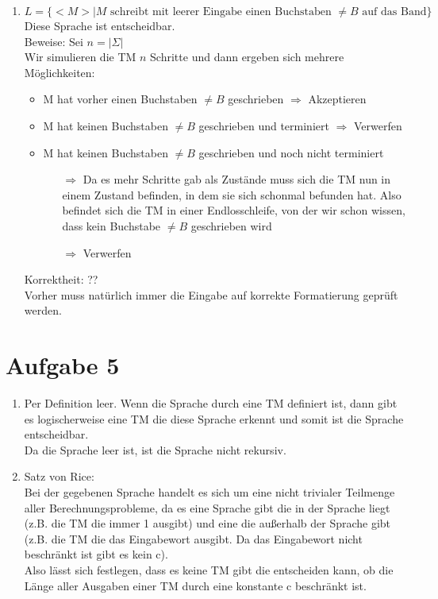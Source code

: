 \documentclass[a4paper,11pt]{scrartcl}
\begin{document}
\begin{enumerate}[label=\alph*)]
	\item	$L = \{<M> \vert M \text{ schreibt mit leerer Eingabe einen Buchstaben } \neq B \text{ auf das Band}\}$\\
			Diese Sprache ist entscheidbar.\\
			Beweise: Sei $n = \vert \Sigma \vert$\\
			Wir simulieren die TM $n$ Schritte und dann ergeben sich mehrere Möglichkeiten:
			\begin{itemize}
			\item M hat vorher einen Buchstaben $\neq B$ geschrieben $\Rightarrow$ Akzeptieren
			\item M hat keinen Buchstaben $\neq B$ geschrieben und terminiert $\Rightarrow$ Verwerfen
			\item M hat keinen Buchstaben $\neq B$ geschrieben und noch nicht terminiert
				\begin{itemize}
				\item[$\Rightarrow$] Da es mehr Schritte gab als Zustände muss sich die TM nun in einem Zustand befinden, in dem sie sich schonmal befunden hat. Also befindet sich die TM in einer Endlosschleife, von der wir schon wissen, dass kein Buchstabe $\neq B$ geschrieben wird
				\item[$\Rightarrow$] Verwerfen
				\end{itemize}
			\end{itemize}
			Korrektheit: ??\\
			Vorher muss natürlich immer die Eingabe auf korrekte Formatierung geprüft werden.
	\end{enumerate}
	
	
	\section*{Aufgabe 5}
	\begin{enumerate}[label=\alph*)]
	\item 	Per Definition leer. Wenn die Sprache durch eine TM definiert ist, dann gibt es logischerweise eine TM die diese Sprache erkennt und somit ist die Sprache entscheidbar.\\
   			Da die Sprache leer ist, ist die Sprache nicht rekursiv.
   	\item 	Satz von Rice: \\
   			Bei der gegebenen Sprache handelt es sich um eine nicht trivialer Teilmenge aller Berechnungsprobleme, da es eine Sprache gibt die in der Sprache liegt (z.B. die TM die immer 1 ausgibt) und eine die außerhalb der Sprache gibt (z.B. die TM die das Eingabewort ausgibt. Da das Eingabewort nicht beschränkt ist gibt es kein c).\\
			Also lässt sich festlegen, dass es keine TM gibt die entscheiden kann, ob die Länge aller Ausgaben einer TM durch eine konstante c beschränkt ist.
	\end{enumerate}
	
\end{document}
